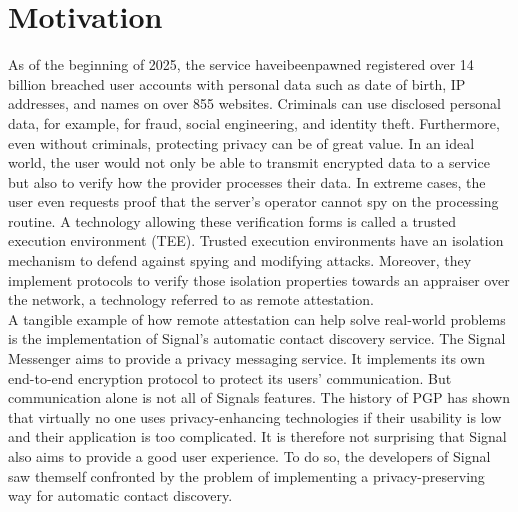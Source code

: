 \section{Motivation}
\label{sec:10:motivation}
As of the beginning of 2025, the service haveibeenpawned registered over 14
billion breached user accounts with personal data such as date of birth, IP
addresses, and names on over 855 websites.\cite{haveibeenpawned} Criminals can
use disclosed personal data, for example, for fraud, social engineering, and
identity theft. Furthermore, even without criminals, protecting privacy can be
of great value.\cite{solove2007ve} In an ideal world, the user would not only be
able to transmit encrypted data to a service but also to verify how the provider
processes their data. In extreme cases, the user even requests proof that the
server's operator cannot spy on the processing routine. A technology allowing
these verification forms is called a trusted execution environment (TEE).
Trusted execution environments have an isolation mechanism to defend against
spying and modifying attacks. Moreover, they implement protocols to verify those
isolation properties towards an appraiser over the network, a technology
referred to as remote attestation. \\

A tangible example of how remote attestation can help solve real-world problems
is the implementation of Signal's automatic contact discovery service. The
Signal Messenger aims to provide a privacy messaging service. It implements its
own end-to-end encryption protocol to protect its users'
communication.\cite{cohn2020formal} But communication alone is not all of
Signals features. The history of PGP has shown that virtually no one uses
privacy-enhancing technologies if their usability is low and their application
is too complicated.\cite{ruoti2015johnny} It is therefore not surprising that
Signal also aims to provide a good user experience. To do so, the developers of
Signal saw themself confronted by the problem of implementing a
privacy-preserving way for automatic contact discovery.\cite{SignalCd}\\

